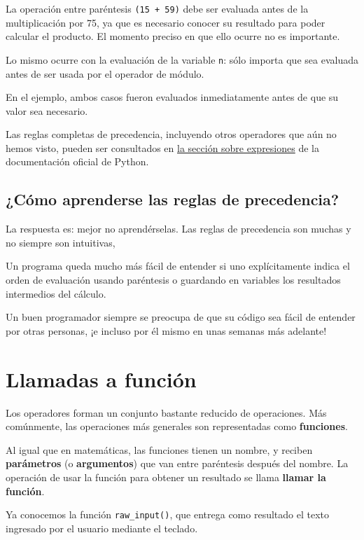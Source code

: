 La operación entre paréntesis \lstinline!(15 + 59)! debe ser evaluada
antes de la multiplicación por 75, ya que es necesario conocer su
resultado para poder calcular el producto. El momento preciso en que
ello ocurre no es importante.

Lo mismo ocurre con la evaluación de la variable \lstinline!n!: sólo
importa que sea evaluada antes de ser usada por el operador de módulo.

En el ejemplo, ambos casos fueron evaluados inmediatamente antes de que
su valor sea necesario.

Las reglas completas de precedencia, incluyendo otros operadores que aún
no hemos visto, pueden ser consultados en
\href{http://docs.python.org/reference/expressions.html\#summary}{la
sección sobre expresiones} de la documentación oficial de Python.

\subsection{¿Cómo aprenderse las reglas de precedencia?}

La respuesta es: mejor no aprendérselas. Las reglas de precedencia son
muchas y no siempre son intuitivas,

Un programa queda mucho más fácil de entender si uno explícitamente
indica el orden de evaluación usando paréntesis o guardando en variables
los resultados intermedios del cálculo.

Un buen programador siempre se preocupa de que su código sea fácil de
entender por otras personas, ¡e incluso por él mismo en unas semanas más
adelante!

\section{Llamadas a función}

Los operadores forman un conjunto bastante reducido de operaciones. Más
comúnmente, las operaciones más generales son representadas como
\textbf{funciones}.

Al igual que en matemáticas, las funciones tienen un nombre, y reciben
\textbf{parámetros} (o \textbf{argumentos}) que van entre paréntesis
después del nombre. La operación de usar la función para obtener un
resultado se llama \textbf{llamar la función}.

Ya conocemos la función \lstinline!raw_input()!, que entrega como
resultado el texto ingresado por el usuario mediante el teclado.

